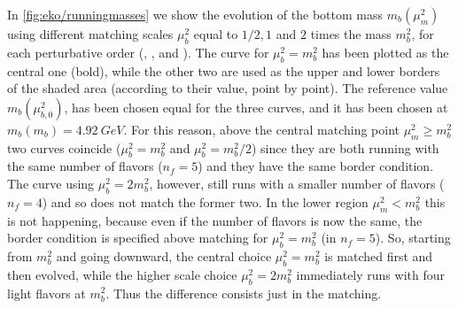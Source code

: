 In \cref{fig:eko/runningmasses} we show the evolution of the \msbar{} bottom mass
$m_b(\mu_m^2)$ using different matching scales $\mu_b^2$ equal to $1/2,1$ and
$2$ times the mass $m_b^2$, for each perturbative order (\lo{}, \nlo{}, and
\nnlo{}).
The curve for $\mu_b^2 = m_b^2$ has been plotted as the central one (bold),
while the other two are used as the upper and lower borders of the shaded area
(according to their value, point by point).
The reference value $m_b(\mu_{b,0}^2)$, has been chosen equal for the
three curves, and it has been chosen at $m_b(m_b) = \SI{4.92}{GeV}$.
For this reason, above the central matching point $\mu_m^2 \ge m_b^2$ two curves coincide
($\mu_b^2 = m_b^2$ and $\mu_b^2 = m_b^2/2$) since they are both
running with the same number of flavors ($n_f=5$) and they have the same
border condition. The curve using $\mu_b^2 = 2m_b^2$, however, still runs with
a smaller number of flavors ($n_f=4$) and so does not match the former two.
In the lower region $\mu_m^2 < m_b^2$ this is not happening, because even
if the number of flavors is now the same,
the border condition is specified above matching for $\mu_b^2 = m_b^2$ (in
$n_f=5$).
So, starting from $m_b^2$ and going downward, the central choice $\mu_b^2 =
m_b^2$ is matched first and then evolved, while the higher scale choice
$\mu_b^2 = 2m_b^2$ immediately runs with four light flavors at $m_b^2$. Thus
the difference consists just in the matching.
